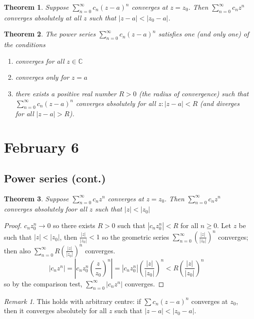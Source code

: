 \documentclass{article}
\theoremstyle{plain}
\newtheorem{theorem}{Theorem}
\theoremstyle{remark}
\newtheorem{remark}{Remark}
\newcommand{\C}{{\mathbb C}}
\begin{document}
\begin{theorem}
	Suppose $\sum_{n=0}^\infty c_n(z-a)^n$ converges at $z = z_0$.
	Then $\sum_{n=0}^\infty c_nz^n$ converges absolutely at all $z$
	such that $|z - a| < |z_0 - a|$.
\end{theorem}
\begin{theorem}
	The power series $\sum_{n=0}^\infty c_n(z-a)^n$ satisfies one (and only one)
	of the conditions
	\begin{enumerate}
		\item[(1)] converges for all $z \in \C$
		\item[(2)] converges only for $z = a$
		\item[(3)] there exists a positive real number $R > 0$
			(the radius of convergence) such that $\sum_{n=0}^\infty c_n(z-a)^n$
			converges absolutely for all $z \colon |z-a| < R$
			(and diverges for all $|z-a| > R$).
	\end{enumerate}
\end{theorem}


\section{February 6}
\subsection{Power series (cont.)}
\begin{theorem}
	Suppose $\sum_{n=0}^\infty c_nz^n$ converges at $z = z_0$.
	Then $\sum_{n=0}^\infty c_nz^n$ converges absolutely
	foor all $z$ such that $|z| < |z_0|$
\end{theorem}
\begin{proof}
	$c_n z_0^n \to 0$ so there exists $R > 0$ such that
	$|c_nz_0^n| < R$ for all $n \geq 0$.
	Let $z$ be such that $|z| < |z_0|$,
	then $\frac{|z|}{|z_0|} < 1$ so the geometric series
	$\sum_{n=0}^\infty \left(\frac{|z|}{|z_0|}\right)^n$ converges;
	then also $\sum_{n=0}^\infty R\left(\frac{|z|}{|z_0|}\right)^n$ converges.
	\[
		|c_nz^n| = \left|c_n z_0^n \left(\frac{z}{z_0}\right)^n\right|
		= |c_nz_0^n|\left(\frac{|z|}{|z_0|}\right)^n < R\left(\frac{|z|}{|z_0|}\right)^n
	\]
	so by the comparison test, $\sum_{n=0}^\infty |c_nz^n|$ converges.
\end{proof}
\begin{remark}
	This holds with arbitrary centre: if $\sum c_n(z-a)^n$ converges
	at $z_0$, then it converges absolutely for all $z$ such that
	$|z-a| < |z_0 - a|$.
\end{remark}
\end{document}
